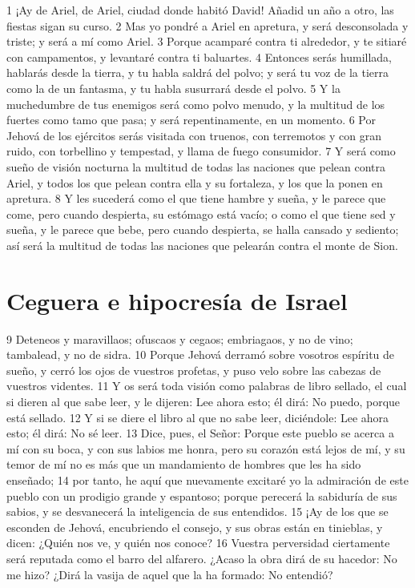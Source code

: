 1 ¡Ay de Ariel, de Ariel, ciudad donde habitó David! Añadid un año a otro, las fiestas sigan su curso.
2 Mas yo pondré a Ariel en apretura, y será desconsolada y triste; y será a mí como Ariel.
3 Porque acamparé contra ti alrededor, y te sitiaré con campamentos, y levantaré contra ti baluartes.
4 Entonces serás humillada, hablarás desde la tierra, y tu habla saldrá del polvo; y será tu voz de la tierra como la de un fantasma, y tu habla susurrará desde el polvo.
5 Y la muchedumbre de tus enemigos será como polvo menudo, y la multitud de los fuertes como tamo que pasa; y será repentinamente, en un momento.
6 Por Jehová de los ejércitos serás visitada con truenos, con terremotos y con gran ruido, con torbellino y tempestad, y llama de fuego consumidor.
7 Y será como sueño de visión nocturna la multitud de todas las naciones que pelean contra Ariel, y todos los que pelean contra ella y su fortaleza, y los que la ponen en apretura.
8 Y les sucederá como el que tiene hambre y sueña, y le parece que come, pero cuando despierta, su estómago está vacío; o como el que tiene sed y sueña, y le parece que bebe, pero cuando despierta, se halla cansado y sediento; así será la multitud de todas las naciones que pelearán contra el monte de Sion.

\section*{Ceguera e hipocresía de Israel}

9 Deteneos y maravillaos; ofuscaos y cegaos; embriagaos, y no de vino; tambalead, y no de sidra.
10 Porque Jehová derramó sobre vosotros espíritu de sueño, y cerró los ojos de vuestros profetas, y puso velo sobre las cabezas de vuestros videntes.
11 Y os será toda visión como palabras de libro sellado, el cual si dieren al que sabe leer, y le dijeren: Lee ahora esto; él dirá: No puedo, porque está sellado.
12 Y si se diere el libro al que no sabe leer, diciéndole: Lee ahora esto; él dirá: No sé leer.
13 Dice, pues, el Señor: Porque este pueblo se acerca a mí con su boca, y con sus labios me honra, pero su corazón está lejos de mí, y su temor de mí no es más que un mandamiento de hombres que les ha sido enseñado;
14 por tanto, he aquí que nuevamente excitaré yo la admiración de este pueblo con un prodigio grande y espantoso; porque perecerá la sabiduría de sus sabios, y se desvanecerá la inteligencia de sus entendidos. 
15 ¡Ay de los que se esconden de Jehová, encubriendo el consejo, y sus obras están en tinieblas, y dicen: ¿Quién nos ve, y quién nos conoce?
16 Vuestra perversidad ciertamente será reputada como el barro del alfarero. ¿Acaso la obra dirá de su hacedor: No me hizo? ¿Dirá la vasija de aquel que la ha formado: No entendió?

